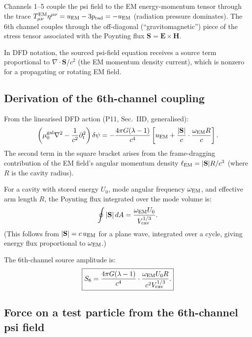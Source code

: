\documentclass[11pt,twocolumn]{article}
\newcommand{\dpsi}{\delta\psi}
\newcommand{\lam}{\lambda}
\newcommand{\uEM}{u_{\rm EM}}
\begin{document}
Channels 1--5 couple the psi field to the EM energy-momentum tensor
through the trace $T_{\mu\nu}^{\rm EM}\eta^{\mu\nu} = \uEM - 3p_{\rm rad}
= -\uEM$ (radiation pressure dominates). The 6th channel couples
through the off-diagonal (``gravitomagnetic'') piece of the stress
tensor associated with the Poynting flux $\mathbf{S} = \mathbf{E}\times\mathbf{H}$.

In DFD notation, the sourced psi-field equation receives a source term
proportional to $\nabla\cdot\mathbf{S}/c^2$ (the EM momentum density
current), which is nonzero for a propagating or rotating EM field.

\subsection{Derivation of the 6th-channel coupling}

From the linearised DFD action (P11, Sec.~IID, generalised):
\begin{equation}
\left(\mu_0^{\rm gal}\nabla^2 - \frac{1}{c^2}\partial_t^2\right)\dpsi
= -\frac{4\pi G(\lam-1)}{c^4}
\left[\uEM + \frac{|\mathbf{S}|}{c}\cdot\frac{\omega_{\rm EM}R}{c}\right].
\label{eq:psi_sourced_gm}
\end{equation}
The second term in the square bracket arises from the frame-dragging
contribution of the EM field's angular momentum density
$\ell_{\rm EM} = |\mathbf{S}|R/c^3$ (where $R$ is the cavity radius).

For a cavity with stored energy $U_0$, mode angular frequency
$\omega_{\rm EM}$, and effective arm length $R$, the Poynting flux
integrated over the mode volume is:
\begin{equation}
\oint |\mathbf{S}|\,dA = \frac{\omega_{\rm EM} U_0}{V_{\rm cav}^{1/3}}.
\label{eq:poynting_integral}
\end{equation}
(This follows from $|\mathbf{S}| = c\,\uEM$ for a plane wave, integrated
over a cycle, giving energy flux proportional to $\omega_{\rm EM}$.)

The 6th-channel source amplitude is:
\begin{equation}
\boxed{
S_6 = \frac{4\pi G(\lam-1)}{c^4}\cdot
\frac{\omega_{\rm EM} U_0 R}{c^2 V_{\rm cav}^{1/3}}.
}
\label{eq:S6}
\end{equation}

\subsection{Force on a test particle from the 6th-channel psi field}
\end{document}
